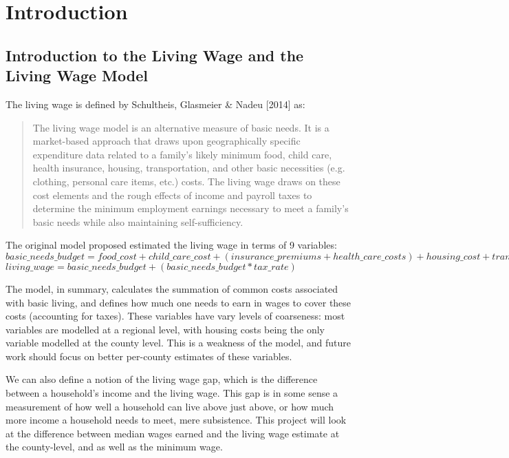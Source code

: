 \chapter{Introduction}\label{ch:introduction}

\section{Introduction to the Living Wage and the Living Wage Model}

The living wage is defined by Schultheis, Glasmeier \& Nadeu [2014]\cite{glasmeier2014} as:

\begin{quote}
The living wage model is an alternative measure of basic needs. It is a market-based approach that draws upon geographically specific expenditure data related to a family's likely minimum food, child care, health insurance, housing, transportation, and other basic necessities (e.g. clothing, personal care items, etc.) costs. The living wage draws on these cost elements and the rough effects of income and payroll taxes to determine the minimum employment earnings necessary to meet a family's basic needs while also maintaining self-sufficiency.
\end{quote}

The original model proposed estimated the living wage in terms of 9 variables:
\newline
\newline
$basic\_needs\_budget = food\_cost + child\_care\_cost + ( insurance\_premiums + health\_care\_costs ) + housing\_cost + transportation\_cost + other\_necessities\_cost$
\newline
\newline
$living\_wage = basic\_needs\_budget + ( basic\_needs\_budget * tax\_rate )$
\newline

The model, in summary, calculates the summation of common costs associated with basic living, and defines how much one needs to earn in wages to cover these costs (accounting for taxes). These variables have vary levels of coarseness: most variables are modelled at a regional level, with housing costs being the only variable modelled at the county level. This is a weakness of the model, and future work should focus on better per-county estimates of these variables.

We can also define a notion of the living wage gap, which is the difference between a household's income and the living wage. This gap is in some sense a measurement of how well a household can live above just above, or how much more income a household needs to meet, mere subsistence.  This project will look at the difference between median wages earned and the living wage estimate at the county-level, and as well as the minimum wage.

